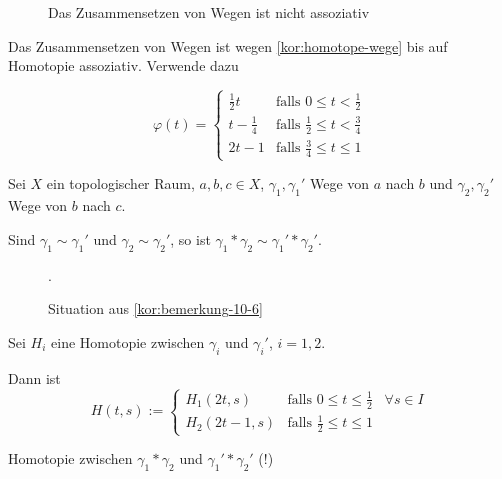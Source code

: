 \begin{beweis}
    \begin{figure}[ht]
        \centering

        \label{fig:assoziativitaet-von-wegen}
        \caption{Das Zusammensetzen von Wegen ist nicht assoziativ}
    \end{figure}

    Das Zusammensetzen von Wegen ist wegen \cref{kor:homotope-wege}
    bis auf Homotopie assoziativ. Verwende dazu

    \[\varphi(t) = \begin{cases}
            \frac{1}{2} t   &\text{falls } 0 \leq t < \frac{1}{2}\\
            t - \frac{1}{4} &\text{falls } \frac{1}{2} \leq t < \frac{3}{4}\\
            2t - 1          &\text{falls } \frac{3}{4} \leq t \leq 1
        \end{cases}\]
\end{beweis}

\begin{bemerkung}\label{kor:bemerkung-10-6}
    Sei $X$ ein topologischer Raum, $a,b,c \in X$, $\gamma_1, \gamma_1'$
    Wege von $a$ nach $b$ und $\gamma_2, \gamma_2'$ Wege von $b$ nach $c$.

    Sind $\gamma_1 \sim \gamma_1'$ und $\gamma_2 \sim \gamma_2'$, so
    ist $\gamma_1 * \gamma_2 \sim \gamma_1 ' * \gamma_2'$.
\end{bemerkung}

\begin{figure}[htp]
    \centering
    
    \caption{Situation aus \cref{kor:bemerkung-10-6}}.
    \label{fig:situation-bemerkung-10-6}
\end{figure}

\begin{beweis}
    Sei $H_i$ eine Homotopie zwischen $\gamma_i$ und $\gamma_i'$,
    $i=1,2$.

    Dann ist 
    \[H(t,s) := \begin{cases}
        H_1(2t, s)  &\text{falls } 0 \leq t \leq \frac{1}{2}\;\;\;\forall s \in I\\
        H_2(2t-1,s) &\text{falls } \frac{1}{2} \leq t \leq 1
    \end{cases}\]

    Homotopie zwischen $\gamma_1 * \gamma_2$ und $\gamma_1' * \gamma_2 '$ (!)
\end{beweis}

